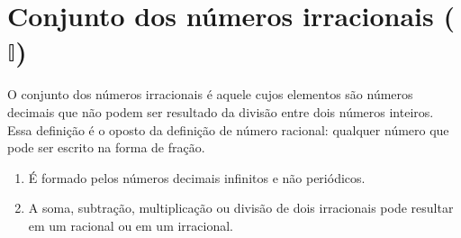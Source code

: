\documentclass[10pt]{article}
\begin{document}
\section*{Conjunto dos números irracionais (\( \mathbb{I} \))}
O conjunto dos números irracionais é aquele cujos elementos são números decimais que não podem ser resultado da divisão entre dois números inteiros. Essa definição é o oposto da definição de número racional: qualquer número que pode ser escrito na forma de fração.
    \begin{enumerate}[label=\textbf{(\Roman*)}]
            \item É formado pelos números decimais infinitos e não periódicos.
            \item A soma, subtração, multiplicação ou divisão de dois irracionais pode resultar em um racional ou em um irracional.
    \end{enumerate}
\end{document}
